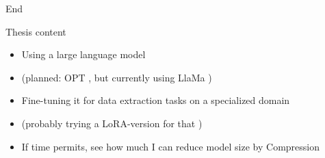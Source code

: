 
\addtocounter{framenumber}{1}
\begin{frame}[standout]
    \Huge
    End
\end{frame}

\appendix
\backupbegin


\begin{frame}[c]{Thesis content} 
    \large
    \begin{itemize}[<+(1)->]
        \item Using a large language model
        \item (planned: OPT \cite{zhang_opt_2022}, but currently using LlaMa \cite{touvron_llama_2023})
        \item Fine-tuning it for data extraction tasks on a specialized domain
        \item (probably trying a LoRA-version for that \cite{hu_lora_2021})
        \item If time permits, see how much I can reduce model size by Compression
    \end{itemize}
\end{frame}

\backupend

